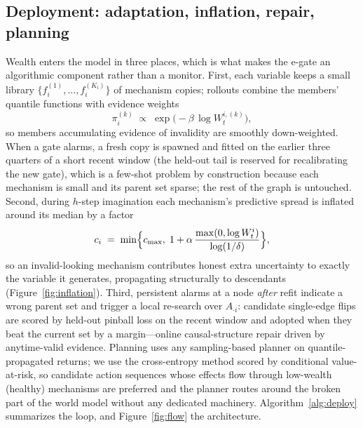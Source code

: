 \documentclass[preprint,12pt]{elsarticle}
\theoremstyle{definition}
\theoremstyle{remark}
\begin{document}
\subsection{Deployment: adaptation, inflation, repair, planning}
\label{sec:deploy}

Wealth enters the model in three places, which is what makes the e-gate
an algorithmic component rather than a monitor. First, each variable
keeps a small library $\{f_i^{(1)},\dots,f_i^{(K_i)}\}$ of mechanism
copies; rollouts combine the members' quantile functions with evidence
weights
\begin{equation}\label{eq:mixture}
\pi_i^{(k)}\;\propto\;\exp\bigl(-\beta\,\log W^{i,(k)}_t\bigr),
\end{equation}
so members accumulating evidence of invalidity are smoothly
down-weighted. When a gate alarms, a fresh copy is spawned and fitted on
the earlier three quarters of a short recent window (the held-out tail is
reserved for recalibrating the new gate), which is a few-shot problem by
construction because each mechanism is small and its parent set sparse;
the rest of the graph is untouched. Second, during $h$-step imagination
each mechanism's predictive spread is inflated around its median by a
factor
\begin{equation}\label{eq:inflation}
c_i \;=\; \min\Bigl\{c_{\max},\;
1+\alpha\,\frac{\max(0,\log W^i_t)}{\log(1/\delta)}\Bigr\},
\end{equation}
so an invalid-looking mechanism contributes honest extra uncertainty to
exactly the variable it generates, propagating structurally to
descendants (Figure~\ref{fig:inflation}). Third, persistent alarms at a
node \emph{after} refit indicate a wrong parent set and trigger a local
re-search over $A_{\cdot i}$: candidate single-edge flips are scored by
held-out pinball loss on the recent window and adopted when they beat the
current set by a margin---online causal-structure repair driven by
anytime-valid evidence. Planning uses any sampling-based planner on
quantile-propagated returns; we use the cross-entropy method scored by
conditional value-at-risk, so candidate action sequences whose effects
flow through low-wealth (healthy) mechanisms are preferred and the
planner routes around the broken part of the world model without any
dedicated machinery. Algorithm~\ref{alg:deploy} summarizes the loop, and
Figure~\ref{fig:flow} the architecture.
\end{document}
